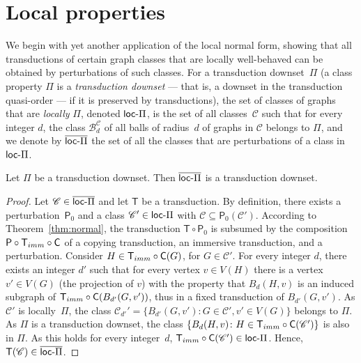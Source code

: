 \documentclass{lmcs}
\newcommand{\Cc}{\mathscr{C}}
\newcommand{\rloc}[2]{\ensuremath{\mathcal{B}_{#1}^{#2}}}
\theoremstyle{definition}
\newcommand{\dset}{downset\xspace}
\begin{document}
\section{Local properties}\label{sec:monadic-dependence-and-monadic-stability}
We begin with yet another application of the local normal form, showing that all transductions of certain graph classes that are locally well-behaved can be obtained by perturbations of such classes. 
For a transduction \dset~$\Pi$ (a class property $\Pi$ is a \emph{transduction \dset} --- that is, a downset in the transduction quasi-order --- if it is preserved by transductions), the set of classes of graphs that are \emph{locally} $\Pi$, denoted $\mbox{\sf loc-}\Pi$, is the set of all classes~$\mathscr C$ such that for every integer $d$, the class $\rloc{d}{\Cc}$ of all balls of radius~$d$ of graphs in $\mathscr C$ belongs to $\Pi$, and we denote by $\overline{\mbox{\sf loc-}\Pi}$  the set of all the classes that are perturbations of a class in $\mbox{\sf loc-}\Pi$.
\begin{thm}
	\label{thm:local-prop}
	Let $\Pi$ be a transduction \dset. Then $\overline{\mbox{\sf loc-}\Pi}$  is a transduction \dset.
\end{thm}	
\begin{proof}
	Let $\mathscr C\in \overline{\mbox{\sf loc-}\Pi}$ and let $\mathsf T$ be a transduction.
	By definition, there exists a perturbation~$\mathsf P_0$ and a class $\mathscr C'\in\mbox{\sf loc-}\Pi$ with $\mathscr C\subseteq\mathsf P_0(\mathscr C')$. According to Theorem~\ref{thm:normal}, the transduction $\mathsf T\circ \mathsf P_0$ is subsumed by the composition $\mathsf P\circ\mathsf T_{\rm imm}\circ\mathsf C$ of a copying transduction, an immersive transduction, and a perturbation. Consider $H\in\mathsf T_{\rm imm}\circ\mathsf C(G)$, for $G\in\mathscr C'$. For every integer $d$, there exists an integer $d'$ such that for every vertex $v\in V(H)$ there is a vertex $v'\in V(G)$ (the projection of $v$) with the property that $B_d(H,v)$ is an induced subgraph of $\mathsf T_{\rm imm}\circ\mathsf C(B_{d'}(G,v'))$, thus in a fixed transduction of $B_{d'}(G,v')$.
	As $\mathscr C'$ is locally~$\Pi$, the class $\mathscr C_{d'}'=\{B_{d'}(G,v')\colon G\in\mathscr C', v'\in V(G)\}$ belongs to $\Pi$.
	As $\Pi$ is a transduction \dset, the class $\{B_d(H,v)\colon H\in \mathsf T_{\rm imm}\circ\mathsf C(\mathscr C')\}$ is also in $\Pi$. As this holds for every integer~$d$, $\mathsf T_{\rm imm}\circ\mathsf C(\mathscr C')\in\mbox{\sf loc-}\Pi$. Hence, $\mathsf T(\mathscr C)\in\overline{\mbox{\sf loc-}\Pi}$.
\end{proof}
\end{document}
